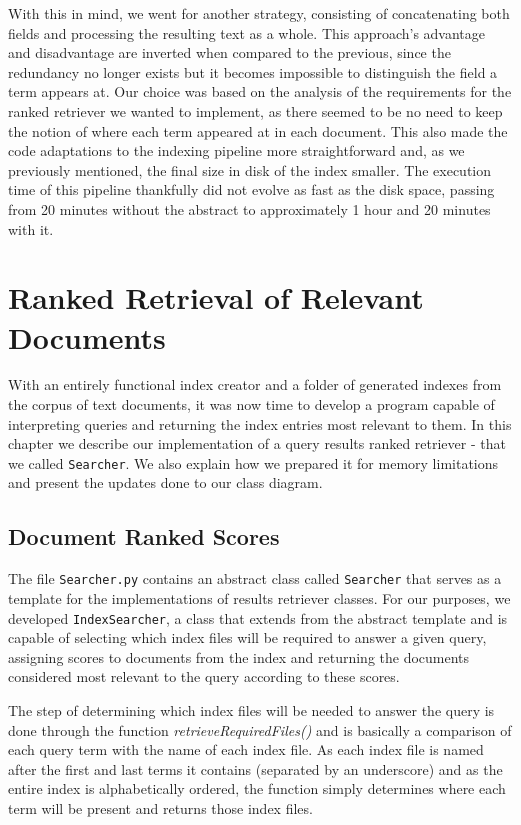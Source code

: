 \documentclass[12pt]{article}
\begin{document}
With this in mind, we went for another strategy, consisting of concatenating 
both fields and processing the resulting text as a whole.
This approach's advantage and disadvantage are inverted when compared to the 
previous, since the redundancy no longer exists but it becomes impossible to
distinguish the field a term appears at.
Our choice was based on the analysis of the requirements for the ranked retriever
we wanted to implement, as there seemed to be no need to keep the notion of where
each term appeared at in each document.
This also made the code adaptations to the indexing pipeline more straightforward 
and, as we previously mentioned, the final size in disk of the index smaller.
The execution time of this pipeline thankfully did not evolve as fast as the
disk space, passing from 20 minutes without the abstract to approximately 1 hour
and 20 minutes with it.

\newpage
\section{Ranked Retrieval of Relevant Documents}

With an entirely functional index creator and a folder of generated indexes from
the corpus of text documents, it was now time to develop a program capable of
interpreting queries and returning the index entries most relevant to them.
In this chapter we describe our implementation of a query results ranked retriever
- that we called \texttt{Searcher}.
We also explain how we prepared it for memory limitations and present the 
updates done to our class diagram.

\subsection{Document Ranked Scores}

The file \texttt{Searcher.py} contains an abstract class called \texttt{Searcher}
that serves as a template for the implementations of results retriever classes.
For our purposes, we developed \texttt{IndexSearcher}, a class that extends from
the abstract template and is capable of selecting which index files will be 
required to answer a given query, assigning scores to documents from the index
and returning the documents considered most relevant to the query according to 
these scores.

The step of determining which index files will be needed to answer the query
is done through the function \textit{retrieveRequiredFiles()} and is basically
a comparison of each query term with the name of each index file.
As each index file is named after the first and last terms it contains (separated
by an underscore) and as the entire index is alphabetically ordered, the function
simply determines where each term will be present and returns those index files.
\end{document}
